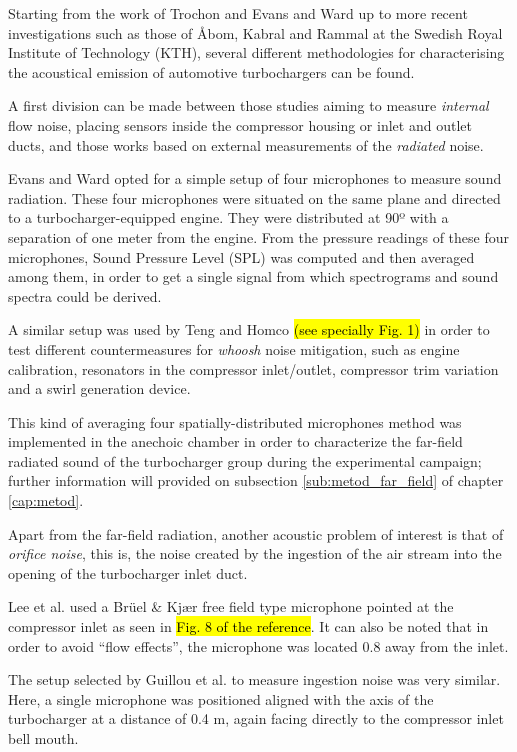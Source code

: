 Starting from the work of Trochon \cite{trochon2001new} and Evans and Ward \cite{evans2005minimizing,evans2006reduction} up to more recent investigations such as those of Åbom, Kabral and Rammal \cite{kabral2013ac,kabral2014inves} at the Swedish Royal Institute of Technology (KTH), several different methodologies for characterising the acoustical emission of automotive turbochargers can be found.

A first division can be made between those studies aiming to measure \emph{internal} flow noise, placing sensors inside the compressor housing or inlet and outlet ducts, and those works based on external measurements of the \emph{radiated} noise.

Evans and Ward \cite{evans2005minimizing,evans2006reduction} opted for a simple setup of four microphones to measure sound radiation. These four microphones were situated on the same plane and directed to a turbocharger-equipped engine. They were distributed at 90º with a separation of one meter from the engine. From the pressure readings of these four microphones, Sound Pressure Level (SPL) was computed and then averaged among them, in order to get a single signal from which spectrograms and sound spectra could be derived.

A similar setup was used by Teng and Homco \cite{teng2009investigation} \hl{(see specially Fig. 1)} in order to test different countermeasures for \emph{whoosh} noise mitigation, such as engine calibration, resonators in the compressor inlet/outlet, compressor trim variation and a swirl generation device. 

This kind of averaging four spatially-distributed microphones method was implemented in the anechoic chamber in order to characterize the far-field radiated sound of the turbocharger group during the experimental campaign; further information will provided on subsection \ref{sub:metod_far_field} of chapter \ref{cap:metod}.

Apart from the far-field radiation, another acoustic problem of interest is that of \emph{orifice noise}, this is, the noise created by the ingestion of the air stream into the opening of the turbocharger inlet duct. 

Lee et al. \cite{lee2011control} used a Brüel \& Kj\ae r free field type microphone pointed at the compressor inlet as seen in \hl{Fig. 8 of the reference}. It can also be noted that in order to avoid ``flow effects'', the microphone was located 0.8 away from the inlet.

The setup selected by Guillou et al. \cite{guillou2010characterization} to measure ingestion noise was very similar. Here, a single microphone was positioned aligned with the axis of the turbocharger at a distance of 0.4 m, again facing directly to the compressor inlet bell mouth.

